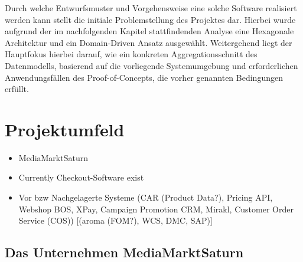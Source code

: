 Durch welche Entwurfsmuster und Vorgehensweise eine solche Software realisiert werden kann stellt die initiale Problemstellung des Projektes dar. Hierbei wurde aufgrund der im nachfolgenden Kapitel stattfindenden Analyse eine Hexagonale Architektur und ein Domain-Driven Ansatz ausgewählt. Weitergehend liegt der Hauptfokus hierbei darauf, wie ein konkreten Aggregationsschnitt des Datenmodells, basierend auf die vorliegende Systemumgebung und erforderlichen Anwendungsfällen des Proof-of-Concepts, die vorher genannten Bedingungen erfüllt.






\section{Projektumfeld}
\begin{itemize}[noitemsep,nolistsep]
	\item MediaMarktSaturn
	\item Currently Checkout-Software exist
	\item Vor bzw Nachgelagerte Systeme (CAR (Product Data?), Pricing API, Webshop BOS, XPay, Campaign Promotion CRM, Mirakl,  Customer Order Service (COS)) [(aroma (FOM?), WCS, DMC, SAP)] %
\end{itemize}

\subsection{Das Unternehmen MediaMarktSaturn}


